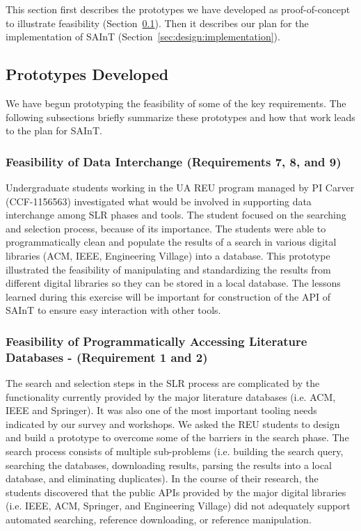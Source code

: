 This section first describes the prototypes we have developed as proof-of-concept to illustrate feasibility (Section~\ref{sec:prototypes}).
Then it describes our plan for the implementation of SAInT (Section~\ref{sec:design:implementation}).

\subsection{Prototypes Developed}
\label{sec:prototypes}
We have begun prototyping the feasibility of some of the key requirements. 
The following subsections briefly summarize these prototypes and how that work leads to the plan for SAInT.

\subsubsection{Feasibility of Data Interchange (Requirements 7, 8, and 9)}
Undergraduate students working in the UA REU program managed by PI Carver (CCF-1156563) investigated what would be involved in supporting data interchange among SLR phases and tools.
The student focused on the searching and selection process, because of its importance.
The students were able to programmatically clean and populate the results of a search in various digital libraries (ACM, IEEE, Engineering Village) into a database.
This prototype illustrated the feasibility of manipulating and standardizing the results from different digital libraries so they can be stored in a local database. 
The lessons learned during this exercise will be important for construction of the API of SAInT to ensure easy interaction with other tools.

\subsubsection{Feasibility of Programmatically Accessing Literature Databases - (Requirement 1 and 2)}
The search and selection steps in the SLR process are complicated by the functionality currently provided by the major literature databases (i.e. ACM, IEEE and Springer). 
It was also one of the most important tooling needs indicated by our survey and workshops.
We asked the REU students to design and build a prototype to overcome some of the barriers in the search phase. 
The search process consists of multiple sub-problems (i.e. building the search query, searching the databases, downloading results, parsing the results into a local database, and eliminating duplicates).
In the course of their research, the students discovered that the public APIs provided by the major digital libraries (i.e. IEEE, ACM, Springer, and Engineering Village) did not adequately support automated searching, reference downloading, or reference manipulation.

